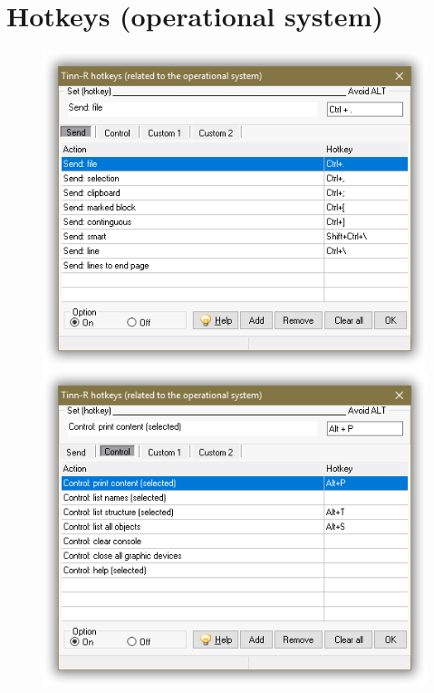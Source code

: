 
\hypertarget{working_hotkeys}{}
\section{Hotkeys (operational system)}

\begin{figure}[h!]
  \includegraphics[scale=0.45]{./res/hotkeys_send.png}
  \includegraphics[scale=0.45]{./res/hotkeys_control.png}

\end{figure}
